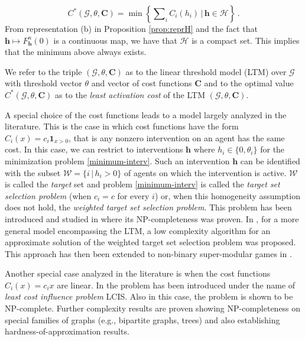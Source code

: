 \documentclass[12pt,twoside,reqno]{amsart}
\theoremstyle{definition}
\numberwithin{equation}{section}
\newcommand{\be}{\begin{equation}}
\newcommand{\ee}{\end{equation}}
\newcommand{\mc}{\mathcal}
\newcommand{\0}{\mathbf{0}}
\newcommand{\1}{\mathbf{1}}
\newcommand{\infl}{h}
\newcommand{\Infl}{\mathbf{\infl}}
\newcommand{\thre}{\theta}
\begin{document}
\be\label{minimum-interv} C^*(\mc G,\thre, \mathbf C)=\min\left\{\sum\nolimits_i C_i(\infl_i)\,|\, \Infl\in\mc H\right\}\,.\ee
From representation (b) in Proposition \ref{prop:reprH} and the fact that $\Infl\mapsto F^n_{\Infl}(0) $ is a continuous map, we have that $\mc H$ is a compact set. This implies that the minimum above always exists.

We refer to the triple $(\mc G, \thre, \mathbf C)$ as to the linear threshold model (LTM) over $\mc G$ with threshold vector $\thre$ and vector of cost functions $\mathbf C$ and to the optimal value $C^*(\mc G,\thre, \mathbf C)$ as to the \emph{least activation cost} of the LTM $(\mc G,\thre, \mathbf C)$.

A special choice of the cost functions leads to a model largely analyzed in the literature. This is the case in which cost functions have the form $C_i(x)=c_i\1_{x>0}$, that is any nonzero intervention on an agent has the same cost. In this case, we can restrict to interventions $\Infl$ where $\infl_i\in\{0, \theta_i\}$ for the minimization problem \eqref{minimum-interv}. Such an intervention $\Infl$ can be identified with the subset $\mc W=\{i\,|\, \infl_i>0\}$ of agents on which the intervention is active. $\mc W$ is called the \emph{target} set and problem \eqref{minimum-interv} is called the \emph{target set selection problem}  (when $c_i=c$ for every $i$) or, when this homogeneity assumption does not hold, the \emph{weighted target set selection problem}. This problem has been introduced and studied in \cite{Chen:2009, Chen:2013} where its NP-completeness was proven. In \cite{Durand:2022}, for a more general 
model encompassing the LTM, a low complexity algorithm for an approximate solution of the weighted target set selection problem was proposed. This approach has then been extended to non-binary super-modular games in \cite{Messina.ea:23}. 

Another special case analyzed in the literature is when the cost functions $C_i(x)=c_ix$ are linear. In \cite{Cordasco.ea:2015, Gunnec.ea:2019} the problem has been introduced under the name of \emph{least cost influence problem} LCIS. Also in this case, the problem is shown to be NP-complete. Further complexity results are proven showing NP-completeness on special families of graphs (e.g., bipartite graphs, trees) and also establishing hardness-of-approximation results.
\end{document}
